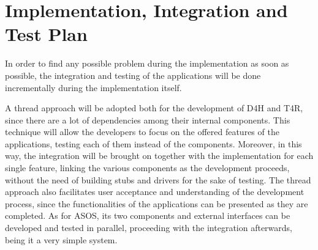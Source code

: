 \chapter{Implementation, Integration and Test Plan}
In order to find any possible problem during the implementation as soon as possible, the integration and testing of the applications will be done incrementally during the implementation itself.

A thread approach will be adopted both for the development of D4H and T4R, since there are a lot of dependencies among their internal components. This technique will allow the developers to focus on the offered features of the applications, testing each of them instead of the components. Moreover, in this way, the integration will be brought on together with the implementation for each single feature, linking the various components as the development proceeds, without the need of building stubs and drivers for the sake of testing. The thread approach also facilitates user acceptance and understanding of the development process, since the functionalities of the applications can be presented as they are completed.
As for ASOS, its two components and external interfaces can be developed and tested in parallel, proceeding with the integration afterwards, being it a very simple system.



